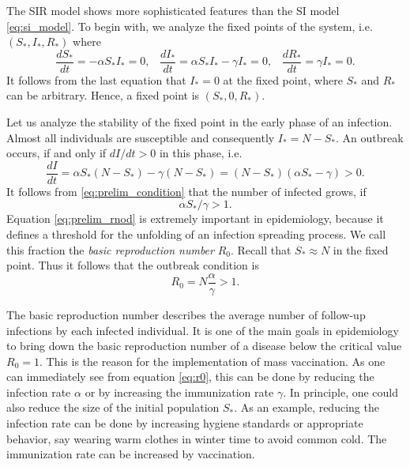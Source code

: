 \documentclass[openright,twoside,headsepline]{scrbook}
\begin{document}
The SIR model shows more sophisticated features than the SI model \eqref{eq:si_model}.
To begin with, we analyze the fixed points of the system, i.e. $(S_*,I_*,R_*)$ where
\begin{equation}
\frac{dS_*}{dt} = -\alpha S_*I_* =0 ,\; \;\;
\frac{dI_*}{dt} = \alpha S_*I_* -\gamma I_* =0,\; \;\;
\frac{dR_*}{dt} = \gamma I_* = 0.
\end{equation}
It follows from the last equation that $I_*=0$ at the fixed point, where $S_*$ and $R_*$ can be arbitrary.
Hence, a fixed point is $(S_*,0,R_*)$.

Let us analyze the stability of the fixed point in the early phase of an infection.
Almost all individuals are susceptible and consequently $I_*=N-S_*$.
An outbreak occurs, if and only if $dI/dt >0$ in this phase, i.e.
\begin{equation}\label{eq:prelim_condition}
\frac{dI}{dt}=\alpha S_* (N-S_*) - \gamma (N-S_*)=(N-S_*)(\alpha S_* -\gamma ) >0.
\end{equation}
It follows from \eqref{eq:prelim_condition} that the number of infected grows, if
\begin{equation}\label{eq:prelim_rnod}
\alpha S_* / \gamma >1.
\end{equation}
Equation \eqref{eq:prelim_rnod} is extremely important in epidemiology, because it defines a threshold for the unfolding of an infection spreading process.
We call this fraction the \emph{basic reproduction number} $R_0$.
Recall that $S_* \approx N$ in the fixed point.
Thus it follows that the outbreak condition is
\begin{equation} \label{eq:r0}
R_0 = N \frac{\alpha }{\gamma } >1.
\end{equation}

The basic reproduction number describes the average number of follow-up infections by each infected individual.
It is one of the main goals in epidemiology to bring down the basic reproduction number of a disease below the critical value $R_0=1$.
This is the reason for the implementation of mass vaccination.
As one can immediately see from equation \eqref{eq:r0}, this can be done by reducing the infection rate $\alpha $ or by increasing the immunization rate $\gamma $.
In principle, one could also reduce the size of the initial population $S_*$.
As an example, reducing the infection rate can be done by increasing hygiene standards or appropriate behavior, say wearing warm clothes in winter time to avoid common cold.
The immunization rate can be increased by vaccination.
\end{document}
